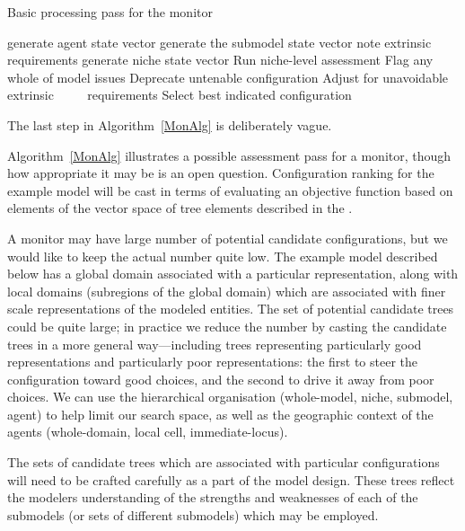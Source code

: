 \begin{algorithm}\label{MonAlg}
  \caption{Basic processing pass for the monitor}
  \begin{algorithmic}
    \State generate agent state vector
    \State generate the sub\-model state vector
    \State \qquad note extrinsic requirements
    \EndFor
    \EndFor
    \State
    \State generate niche state vector
    \EndFor
    \State
    \State Run niche-level assessment
    \State Flag any whole of model issues
    \State Deprecate untenable con\-fig\-ur\-a\-tion
    \State Adjust for unavoidable extrinsic
    \State $\qquad$ requirements
    \EndFor
    \State
    \State Select best indicated con\-fig\-ur\-a\-tion
  \end{algorithmic}
\end{algorithm} The last step in Algorithm~\ref{MonAlg} is deliberately vague. 

Algorithm~\ref{MonAlg} illustrates a possible
assessment pass for a monitor, though how appropriate it may be is an
open question. Configuration ranking for the example model will be
cast in terms of evaluating an objective function based on elements of
the vector space of tree elements described in the \appendixname.

A monitor may have large number of potential candidate con\-fig\-ur\-a\-tions,
but we would like to keep the actual number quite low. The example
model described below has a global domain associated with a particular
rep\-re\-sen\-ta\-tion, along with local domains (subregions of the global
domain) which are associated with finer scale rep\-re\-sen\-ta\-tions of the
modeled entities. The set of potential candidate trees could be quite
large; in practice we reduce the number by casting the candidate trees
in a more general way---including trees representing particularly
good rep\-re\-sen\-ta\-tions and particularly poor rep\-re\-sen\-ta\-tions: the first
to steer the con\-fig\-ur\-a\-tion toward good choices, and the second to
drive it away from poor choices. We can use the hierarchical
organisation (whole-model, niche, sub\-model, agent) to help limit our
search space, as well as the geographic context of the agents (whole-domain, local
cell, immediate-locus).

The sets of candidate trees which are associated with particular
con\-fig\-ur\-a\-tions will need to be crafted carefully as a part of the
model design. These trees reflect the modelers understanding of the
strengths and weaknesses of each of the sub\-models (or sets of
different sub\-models) which may be employed.

